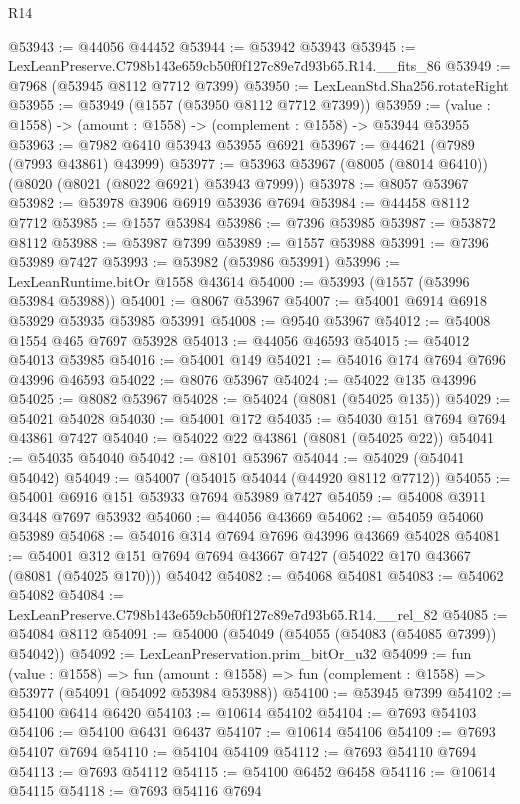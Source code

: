 \begin{lexlean}{R14}
\begin{coremodule}
@53943 := @44056 @44452
@53944 := @53942 @53943
@53945 := LexLeanPreserve.C798b143e659cb50f0f127c89e7d93b65.R14.__fits_86
@53949 := @7968 (@53945 @8112 @7712 @7399)
@53950 := LexLeanStd.Sha256.rotateRight
@53955 := @53949 (@1557 (@53950 @8112 @7712 @7399))
@53959 := (value : @1558) -> (amount : @1558) -> (complement : @1558) -> @53944 @53955
@53963 := @7982 @6410 @53943 @53955 @6921
@53967 := @44621 (@7989 (@7993 @43861) @43999)
@53977 := @53963 @53967 (@8005 (@8014 @6410)) (@8020 (@8021 (@8022 @6921) @53943 @7999))
@53978 := @8057 @53967
@53982 := @53978 @3906 @6919 @53936 @7694
@53984 := @44458 @8112 @7712
@53985 := @1557 @53984
@53986 := @7396 @53985
@53987 := @53872 @8112
@53988 := @53987 @7399
@53989 := @1557 @53988
@53991 := @7396 @53989 @7427
@53993 := @53982 (@53986 @53991)
@53996 := LexLeanRuntime.bitOr @1558 @43614
@54000 := @53993 (@1557 (@53996 @53984 @53988))
@54001 := @8067 @53967
@54007 := @54001 @6914 @6918 @53929 @53935 @53985 @53991
@54008 := @9540 @53967
@54012 := @54008 @1554 @465 @7697 @53928
@54013 := @44056 @46593
@54015 := @54012 @54013 @53985
@54016 := @54001 @149
@54021 := @54016 @174 @7694 @7696 @43996 @46593
@54022 := @8076 @53967
@54024 := @54022 @135 @43996
@54025 := @8082 @53967
@54028 := @54024 (@8081 (@54025 @135))
@54029 := @54021 @54028
@54030 := @54001 @172
@54035 := @54030 @151 @7694 @7694 @43861 @7427
@54040 := @54022 @22 @43861 (@8081 (@54025 @22))
@54041 := @54035 @54040
@54042 := @8101 @53967
@54044 := @54029 (@54041 @54042)
@54049 := @54007 (@54015 @54044 (@44920 @8112 @7712))
@54055 := @54001 @6916 @151 @53933 @7694 @53989 @7427
@54059 := @54008 @3911 @3448 @7697 @53932
@54060 := @44056 @43669
@54062 := @54059 @54060 @53989
@54068 := @54016 @314 @7694 @7696 @43996 @43669 @54028
@54081 := @54001
    @312
    @151
    @7694
    @7694
    @43667
    @7427
    (@54022 @170 @43667 (@8081 (@54025 @170)))
    @54042
@54082 := @54068 @54081
@54083 := @54062 @54082
@54084 := LexLeanPreserve.C798b143e659cb50f0f127c89e7d93b65.R14.__rel_82
@54085 := @54084 @8112
@54091 := @54000 (@54049 (@54055 (@54083 (@54085 @7399)) @54042))
@54092 := LexLeanPreservation.prim_bitOr_u32
@54099 := fun (value : @1558) =>
  fun (amount : @1558) => fun (complement : @1558) => @53977 (@54091 (@54092 @53984 @53988))
@54100 := @53945 @7399
@54102 := @54100 @6414 @6420
@54103 := @10614 @54102
@54104 := @7693 @54103
@54106 := @54100 @6431 @6437
@54107 := @10614 @54106
@54109 := @7693 @54107 @7694
@54110 := @54104 @54109
@54112 := @7693 @54110 @7694
@54113 := @7693 @54112
@54115 := @54100 @6452 @6458
@54116 := @10614 @54115
@54118 := @7693 @54116 @7694

\end{coremodule}
\end{lexlean}
